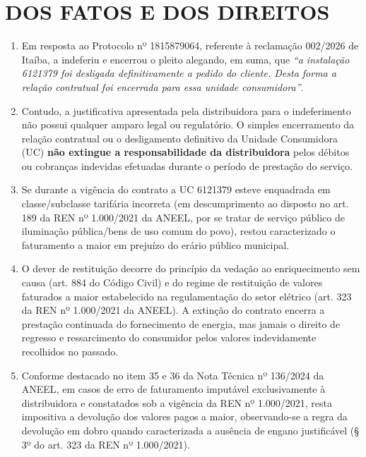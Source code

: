 \newcommand{\tipoRequerimento}{Contestação de Indeferimento por Desligamento de UC}

\section{DOS FATOS E DOS DIREITOS}

\begin{enumerate}[resume]
    \item Em resposta ao Protocolo nº 1815879064, referente à reclamação 002/2026 de Itaíba, a \nomeConcessionaria{} indeferiu e encerrou o pleito alegando, em suma, que \textit{“a instalação 6121379 foi desligada definitivamente a pedido do cliente. Desta forma a relação contratual foi encerrada para essa unidade consumidora”}.

    \item Contudo, a justificativa apresentada pela distribuidora para o indeferimento não possui qualquer amparo legal ou regulatório. O simples encerramento da relação contratual ou o desligamento definitivo da Unidade Consumidora (UC) \textbf{não extingue a responsabilidade da distribuidora} pelos débitos ou cobranças indevidas efetuadas durante o período de prestação do serviço.

    \item Se durante a vigência do contrato a UC 6121379 esteve enquadrada em classe/subclasse tarifária incorreta (em descumprimento ao disposto no art. 189 da REN nº 1.000/2021 da ANEEL, por se tratar de serviço público de iluminação pública/bens de uso comum do povo), restou caracterizado o faturamento a maior em prejuízo do erário público municipal.

    \item O dever de restituição decorre do princípio da vedação ao enriquecimento sem causa (art. 884 do Código Civil) e do regime de restituição de valores faturados a maior estabelecido na regulamentação do setor elétrico (art. 323 da REN nº 1.000/2021 da ANEEL). A extinção do contrato encerra a prestação continuada do fornecimento de energia, mas jamais o direito de regresso e ressarcimento do consumidor pelos valores indevidamente recolhidos no passado.

    \item Conforme destacado no item 35 e 36 da Nota Técnica nº 136/2024 da ANEEL, em casos de erro de faturamento imputável exclusivamente à distribuidora e constatados sob a vigência da REN nº 1.000/2021, resta impositiva a devolução dos valores pagos a maior, observando-se a regra da devolução em dobro quando caracterizada a ausência de engano justificável (§ 3º do art. 323 da REN nº 1.000/2021).


\end{enumerate}
